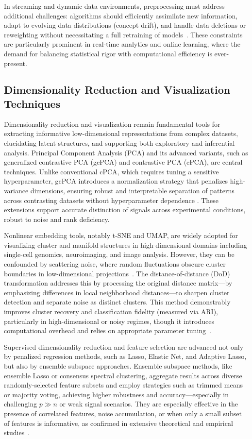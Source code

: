 \documentclass[sigconf]{acmart}
\begin{document}
In streaming and dynamic data environments, preprocessing must address additional challenges: algorithms should efficiently assimilate new information, adapt to evolving data distributions (concept drift), and handle data deletions or reweighting without necessitating a full retraining of models~\cite{ref76,ref79,ref80,ref86}. These constraints are particularly prominent in real-time analytics and online learning, where the demand for balancing statistical rigor with computational efficiency is ever-present.

\subsection{Dimensionality Reduction and Visualization Techniques}

Dimensionality reduction and visualization remain fundamental tools for extracting informative low-dimensional representations from complex datasets, elucidating latent structures, and supporting both exploratory and inferential analysis. Principal Component Analysis (PCA) and its advanced variants, such as generalized contrastive PCA (gcPCA) and contrastive PCA (cPCA), are central techniques. Unlike conventional cPCA, which requires tuning a sensitive hyperparameter, gcPCA introduces a normalization strategy that penalizes high-variance dimensions, ensuring robust and interpretable separation of patterns across contrasting datasets without hyperparameter dependence \cite{ref97,ref99}. These extensions support accurate distinction of signals across experimental conditions, robust to noise and rank deficiency.

Nonlinear embedding tools, notably t-SNE and UMAP, are widely adopted for visualizing cluster and manifold structures in high-dimensional domains including single-cell genomics, neuroimaging, and image analysis. However, they can be confounded by scattering noise, where random fluctuations obscure cluster boundaries in low-dimensional projections~\cite{ref99}. The distance-of-distance (DoD) transformation addresses this by processing the original distance matrix—by emphasizing differences in local neighborhood distances—to sharpen cluster detection and separate noise as distinct clusters. This method demonstrably improves cluster recovery and classification fidelity (measured via ARI), particularly in high-dimensional or noisy regimes, though it introduces computational overhead and relies on appropriate parameter tuning~\cite{ref101}.

Supervised dimensionality reduction and feature selection are advanced not only by penalized regression methods, such as Lasso, Elastic Net, and Adaptive Lasso, but also by ensemble subspace approaches. Ensemble subspace methods, like ensemble Lasso or consensus spectral clustering, aggregate results across diverse randomly-selected feature subsets and employ strategies such as trimmed means or majority voting, achieving higher robustness and accuracy—especially in challenging $p \gg n$ or weak signal scenarios. They are especially effective in the presence of correlated features, noise accumulation, or when only a small subset of features is informative, as confirmed in extensive theoretical and empirical studies~\cite{ref97,ref116}.
\end{document}
